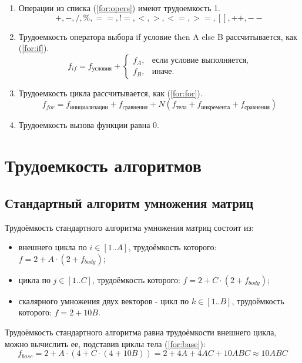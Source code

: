 \begin{enumerate}
	\item Операции из списка (\ref{for:opers}) имеют трудоемкость 1.
	\begin{equation}
		\label{for:opers}
		+, -, /, \%, ==, !=, <, >, <=, >=, [], ++, {-}-
	\end{equation}
	\item Трудоемкость оператора выбора if условие then A else B рассчитывается, как (\ref{for:if}).
	\begin{equation}
		\label{for:if}
		f_{if} = f_{\text{условия}} +
		\begin{cases}
			f_A, & \text{если условие выполняется,}\\
			f_B, & \text{иначе.}
		\end{cases}
	\end{equation}
	\item Трудоемкость цикла рассчитывается, как (\ref{for:for}).
	\begin{equation}
		\label{for:for}
		f_{for} = f_{\text{инициализации}} + f_{\text{сравнения}} + N(f_{\text{тела}} + f_{\text{инкремента}} + f_{\text{сравнения}})
	\end{equation}
	\item Трудоемкость вызова функции равна 0.
\end{enumerate}

\section{Трудоемкость алгоритмов}
\subsection{Стандартный алгоритм умножения матриц}

Трудоёмкость стандартного алгоритма умножения матриц состоит из:
\begin{itemize}
	\item внешнего цикла по $i \in [1..A]$, трудоёмкость которого: $f = 2 + A \cdot (2 + f_{body})$;
	\item цикла по $j \in [1..C]$, трудоёмкость которого: $f = 2 + C \cdot (2 + f_{body})$;
	\item скалярного умножения двух векторов - цикл по $k \in [1..B]$, трудоёмкость которого: $f = 2 + 10B$.
\end{itemize}

Трудоёмкость стандартного алгоритма равна трудоёмкости внешнего цикла, можно вычислить ее, подставив циклы тела (\ref{for:base}):
\begin{equation}
	\label{for:base}
	f_{base} = 2 + A \cdot (4 + C \cdot (4 + 10B)) = 2 + 4A + 4AC + 10ABC \approx 10ABC
\end{equation}

